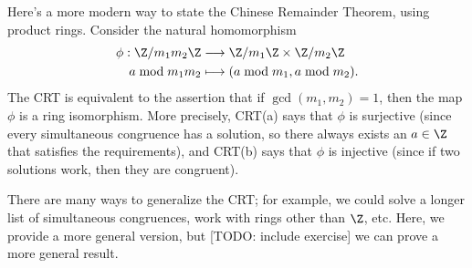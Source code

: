 \documentclass[math1530-lecture-notes]{subfiles}
\begin{document}
\begin{remark}
  Here's a more modern way to state the Chinese Remainder Theorem, using product rings. Consider the
  natural homomorphism \begin{align*}
    \phi: \Z / m_1m_2\Z &\longrightarrow \Z /m_1\Z\times \Z / m_2\Z \\
    a\bmod{m_1m_2} &\longmapsto (a\bmod{m_1},a\bmod{m_2})
  .\end{align*}
  The CRT is equivalent to the assertion that if $\gcd{(m_1,m_2)}=1$, then the map $\phi$ is a ring
  isomorphism. More precisely, CRT(a) says that $\phi$ is surjective (since every simultaneous
  congruence has a solution, so there always exists an $a\in \Z$ that satisfies the requirements),
  and CRT(b) says that $\phi$ is injective (since if two solutions work, then they are congruent).
\end{remark}

There are many ways to generalize the CRT; for example, we could solve a longer list of simultaneous
congruences, work with rings other than $\Z$, etc. Here, we provide a more general version, but
[TODO: include exercise] we can prove a more general result.
\end{document}
